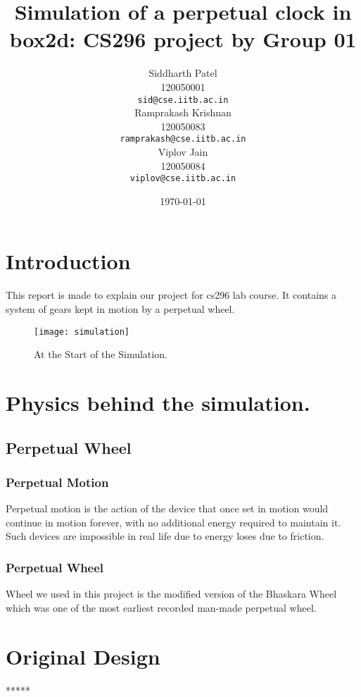 \documentclass{article}
\begin{document}
\title{Simulation of a perpetual clock in box2d: CS296 project by Group 01}
\author{Siddharth Patel\\
  120050001\\
  \texttt{sid@cse.iitb.ac.in}\\
  Ramprakash Krishnan\\
  120050083\\
  \texttt{ramprakash@cse.iitb.ac.in}\\
  Viplov Jain\\
  120050084\\
  \texttt{viplov@cse.iitb.ac.in}\\}
\date{\today}
\maketitle


\section{Introduction}
This report is made to explain our project for cs296 lab course. It contains a system of gears kept in motion by a perpetual wheel.
\begin{figure}[h!] 
\centering 
\texttt{[image: simulation]} 
\caption{At the Start of the Simulation.} 
\end{figure}

\section{Physics behind the simulation.}
\subsection{Perpetual Wheel}
\subsubsection{Perpetual Motion}
Perpetual motion is the action of the device that once set in motion would continue in motion forever, with no additional energy required to maintain it. Such devices are impossible in real life due to energy loses due to friction. 
\subsubsection{Perpetual Wheel}
Wheel we used in this project is the modified version of the Bhaskara Wheel which was one of the most earliest recorded man-made perpetual wheel. 
\section{Original Design}
*****
\end{document}
